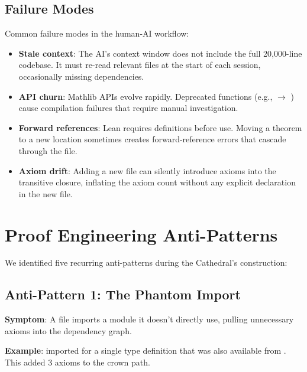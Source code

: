 \documentclass[11pt,a4paper]{article}
\begin{document}
\subsection{Failure Modes}

Common failure modes in the human-AI workflow:

\begin{itemize}
  \item \textbf{Stale context}: The AI's context window does not
    include the full 20,000-line codebase. It must re-read relevant
    files at the start of each session, occasionally missing
    dependencies.
  \item \textbf{API churn}: Mathlib APIs evolve rapidly.
    Deprecated functions (e.g.,  $\to$
    ) cause compilation failures that
    require manual investigation.
  \item \textbf{Forward references}: Lean requires definitions
    before use. Moving a theorem to a new location sometimes creates
    forward-reference errors that cascade through the file.
  \item \textbf{Axiom drift}: Adding a new file can silently introduce
    axioms into the transitive closure, inflating the axiom count
    without any explicit  declaration in the new file.
\end{itemize}

\section{Proof Engineering Anti-Patterns}
\label{sec:antipatterns}

We identified five recurring anti-patterns during the Cathedral's
construction:

\subsection{Anti-Pattern 1: The Phantom Import}

\textbf{Symptom}: A file imports a module it doesn't directly use,
pulling unnecessary axioms into the dependency graph.

\textbf{Example}:  imported
 for a single type definition
that was also available from . This added 3 axioms
to the crown path.
\end{document}
